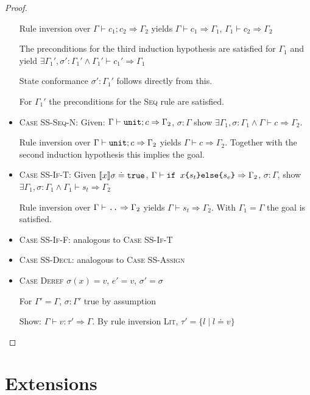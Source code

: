 \documentclass[twoside, english]{sdqthesis}
\theoremstyle{definition}
\begin{document}
\begin{proof}
\begin{itemize}
    Rule inversion over $\Gamma \vdash c_1 ; c_2 \Rightarrow \Gamma_2$ yields $\Gamma \vdash c_1 \Rightarrow \Gamma_1$, $\Gamma_1 \vdash c_2 \Rightarrow \Gamma_2$

    The preconditions for the third induction hypothesis are satisfied for $\Gamma_1$ and yield 
    $\exists \Gamma_1', \sigma' : \Gamma_1' \wedge \Gamma_1' \vdash c_1' \Rightarrow \Gamma_1$

    State conformance $\sigma' : \Gamma_1'$ follows directly from this.

    For $\Gamma_1'$ the preconditions for the \textsc{Seq} rule are satisfied.
  \item \textsc{Case SS-Seq-N}: 
    Given: $\Gamma \vdash \code{unit}; c \Rightarrow \Gamma_2$, $\sigma : \Gamma$
    show $\exists \Gamma_1, \sigma : \Gamma_1 \wedge \Gamma \vdash c \Rightarrow \Gamma_2$.

    Rule inversion over $\Gamma \vdash \code{unit}; c \Rightarrow \Gamma_2$ yields $\Gamma \vdash c \Rightarrow \Gamma_2$.
    Together with the second induction hypothesis this implies the goal.
  \item \textsc{Case SS-If-T}:
     Given $\llbracket x \rrbracket \sigma \doteq \code{true}$, $\Gamma \vdash \code{if $x$\{$s_t$\}else\{$s_e$\}} \Rightarrow \Gamma_2$, $\sigma : \Gamma$, show $\exists \Gamma_1, \sigma : \Gamma_1 \wedge \Gamma_1 \vdash s_t \Rightarrow \Gamma_2$
    
    Rule inversion over $\Gamma \vdash \code{..} \Rightarrow \Gamma_2$ yields $\Gamma \vdash s_t \Rightarrow \Gamma_2$.
    With $\Gamma_1 = \Gamma$ the goal is satisfied.
  \item \textsc{Case SS-If-F}: analogous to \textsc{Case SS-If-T}
  \item \textsc{Case SS-Decl}: analogous to \textsc{Case SS-Assign}
  \item \textsc{Case Deref}
    $\sigma(x) = v$, $e' = v$, $\sigma' = \sigma$

    For $\Gamma' = \Gamma$, $\sigma : \Gamma'$ true by assumption

    Show: $\Gamma \vdash v : \tau' \Rightarrow \Gamma$. By rule inversion \textsc{Lit}, $\tau' = \{ l \mid l \doteq v \}$
\end{itemize}
\end{proof}


\iftrue %
\label{sec:extensions} \section{Extensions}
\end{document}
